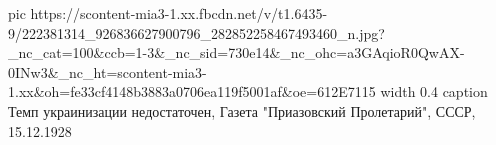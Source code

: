 
 
 
 
 

\ifcmt
  pic https://scontent-mia3-1.xx.fbcdn.net/v/t1.6435-9/222381314_926836627900796_282852258467493460_n.jpg?_nc_cat=100&ccb=1-3&_nc_sid=730e14&_nc_ohc=a3GAqioR0QwAX-0INw3&_nc_ht=scontent-mia3-1.xx&oh=fe33cf4148b3883a0706ea119f5001af&oe=612E7115
  width 0.4
	caption Темп украинизации недостаточен, Газета "Приазовский Пролетарий", СССР, 15.12.1928
\fi
